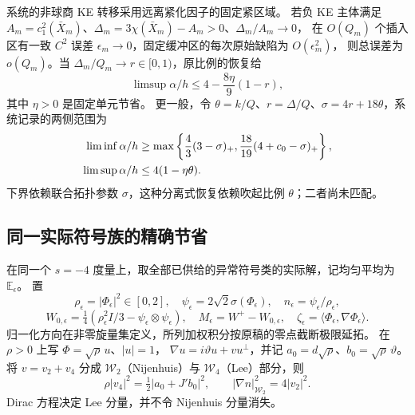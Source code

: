 \documentclass[UTF8,11pt,a4paper,fontset=none]{ctexart}
\numberwithin{equation}{section}
\theoremstyle{definition}
\theoremstyle{remark}\newtheorem{remark}[theorem]{说明}
\begin{document}
系统的非球商 KE 转移采用远离紧化因子的固定紧区域。
若负 KE 主体满足 $A_m=c_1^2(\bar X_m)$、$\Delta_m=3\chi(\bar X_m)-A_m>0$、$\Delta_m/A_m\to0$，
在 $O(Q_m)$ 个插入区有一致 $C^2$ 误差 $\epsilon_m\to0$，固定缓冲区的每次原始缺陷为 $O(\epsilon_m^2)$，
则总误差为 $o(Q_m)$。当 $\Delta_m/Q_m\to r\in[0,1)$，原比例的恢复给
\[
\limsup\alpha/h\le4-\frac{8\eta}{9}(1-r),
\]
其中 $\eta>0$ 是固定单元节省。
更一般，令 $\theta=k/Q$、$r=\Delta/Q$、$\sigma=4r+18\theta$，系统记录的两侧范围为
\begin{align}
\liminf\alpha/h&\ge
\max\left\{\frac43(3-\sigma)_+,\frac{18}{19}(4+c_0-\sigma)_+\right\},\notag\\
\limsup\alpha/h&\le4(1-\eta\theta).
\label{eq:two-parameters}
\end{align}
下界依赖联合拓扑参数 $\sigma$，这种分离式恢复依赖吹起比例 $\theta$；二者尚未匹配。

\subsection{同一实际符号族的精确节省}
在同一个 $s=-4$ 度量上，取全部已供给的异常符号类的实际解，记均匀平均为 $\mathbb E_\epsilon$。
置
\[
\rho_\epsilon=|\Phi_\epsilon|^2\in[0,2],\quad
\psi_\epsilon=2\sqrt2\sigma(\Phi_\epsilon),\quad
n_\epsilon=\psi_\epsilon/\rho_\epsilon,
\]
\[
W_{0,\epsilon}=\tfrac14(\rho_\epsilon^2 I/3-\psi_\epsilon\otimes\psi_\epsilon),
\quad M_\epsilon=W^+-W_{0,\epsilon},\quad
\zeta_\epsilon=\langle\Phi_\epsilon,\nabla\Phi_\epsilon\rangle.
\]
归一化方向在非零旋量集定义，所列加权积分按原稿的零点截断极限延拓。
在 $\rho>0$ 上写 $\Phi=\sqrt\rho\,u$、$|u|=1$，
$\nabla u=i\vartheta u+v u^\perp$，并记
$a_0=d\sqrt\rho$、$b_0=\sqrt\rho\,\vartheta$。
将 $v=v_2+v_4$ 分成 $\mathcal W_2$（Nijenhuis）与 $\mathcal W_4$（Lee）部分，则
\[
\rho|v_4|^2=\tfrac12|a_0+J'b_0|^2,
\qquad |\nabla n|_{\mathcal W_2}^2=4|v_2|^2.
\]
Dirac 方程决定 Lee 分量，并不令 Nijenhuis 分量消失。
\end{document}

